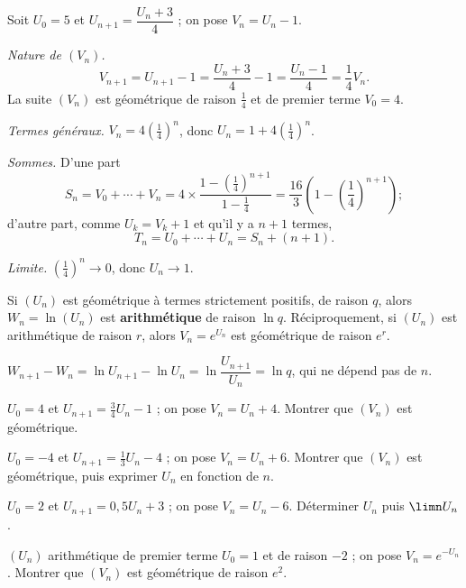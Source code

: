 \begin{exemple}
Soit $U_{0} = 5$ et $U_{n+1} = \dfrac{U_{n}+3}{4}$ ; on pose
$V_{n} = U_{n}-1$.

\emph{Nature de $\left(V_{n}\right)$.}
\[
  V_{n+1} = U_{n+1}-1 = \frac{U_{n}+3}{4}-1 = \frac{U_{n}-1}{4}
  = \frac14 V_{n} .
\]
La suite $\left(V_{n}\right)$ est géométrique de raison $\frac14$ et de
premier terme $V_{0} = 4$.

\emph{Termes généraux.} $V_{n} = 4\left(\frac14\right)^{n}$, donc
$U_{n} = 1+4\left(\frac14\right)^{n}$.

\emph{Sommes.} D'une part
\[
  S_{n} = V_{0}+\cdots+V_{n}
  = 4\times\frac{1-\left(\frac14\right)^{n+1}}{1-\frac14}
  = \frac{16}{3}\left(1-\left(\frac14\right)^{n+1}\right) ;
\]
d'autre part, comme $U_{k} = V_{k}+1$ et qu'il y a $n+1$ termes,
\[
  T_{n} = U_{0}+\cdots+U_{n} = S_{n}+(n+1) .
\]

\emph{Limite.} $\left(\frac14\right)^{n} \to 0$, donc $U_{n} \to 1$.
\end{exemple}

\begin{propriete}
Si $\left(U_{n}\right)$ est géométrique à termes strictement positifs, de
raison $q$, alors $W_{n} = \ln\left(U_{n}\right)$ est \textbf{arithmétique}
de raison $\ln q$. Réciproquement, si $\left(U_{n}\right)$ est arithmétique
de raison $r$, alors $V_{n} = e^{U_{n}}$ est géométrique de raison $e^{r}$.
\end{propriete}

\begin{demonstration}
$W_{n+1}-W_{n} = \ln U_{n+1}-\ln U_{n} = \ln\dfrac{U_{n+1}}{U_{n}} = \ln q$,
qui ne dépend pas de $n$.
\end{demonstration}

\begin{entrainement}
\exo[\niveau{2}] $U_{0} = 4$ et $U_{n+1} = \frac34U_{n}-1$ ; on pose
$V_{n} = U_{n}+4$. Montrer que $\left(V_{n}\right)$ est géométrique.

\exo[\niveau{2}] $U_{0} = -4$ et $U_{n+1} = \frac13U_{n}-4$ ; on pose
$V_{n} = U_{n}+6$. Montrer que $\left(V_{n}\right)$ est géométrique, puis
exprimer $U_{n}$ en fonction de $n$.

\exo[\niveau{3}] $U_{0} = 2$ et $U_{n+1} = 0{,}5U_{n}+3$ ; on pose
$V_{n} = U_{n}-6$. Déterminer $U_{n}$ puis $\limn U_{n}$.

\exo[\niveau{3}] $\left(U_{n}\right)$ arithmétique de premier terme
$U_{0} = 1$ et de raison $-2$ ; on pose $V_{n} = e^{-U_{n}}$. Montrer que
$\left(V_{n}\right)$ est géométrique de raison $e^{2}$.
\end{entrainement}

